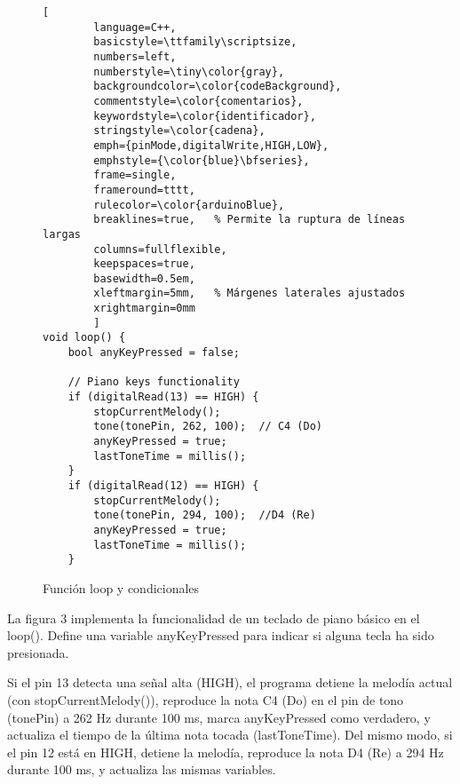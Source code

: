 
\setlength{\parindent}{0pt}
\setlength{\parskip}{6pt}



\begin{figure}[H]
	\centering
	\begin{lstlisting}[
		language=C++,
		basicstyle=\ttfamily\scriptsize,
		numbers=left,
		numberstyle=\tiny\color{gray},
		backgroundcolor=\color{codeBackground},
		commentstyle=\color{comentarios},
		keywordstyle=\color{identificador},
		stringstyle=\color{cadena},
		emph={pinMode,digitalWrite,HIGH,LOW},
		emphstyle={\color{blue}\bfseries},
		frame=single,
		frameround=tttt,
		rulecolor=\color{arduinoBlue},
		breaklines=true,   % Permite la ruptura de líneas largas
		columns=fullflexible,
		keepspaces=true,
		basewidth=0.5em,
		xleftmargin=5mm,   % Márgenes laterales ajustados
		xrightmargin=0mm
		]
void loop() {
	bool anyKeyPressed = false;
	
	// Piano keys functionality
	if (digitalRead(13) == HIGH) {
		stopCurrentMelody();
		tone(tonePin, 262, 100);  // C4 (Do)
		anyKeyPressed = true;
		lastToneTime = millis();
	}
	if (digitalRead(12) == HIGH) {
		stopCurrentMelody();
		tone(tonePin, 294, 100);  //D4 (Re)
		anyKeyPressed = true;
		lastToneTime = millis();
	}
	\end{lstlisting}
	\caption{Función loop y condicionales}
	\label{fig:codigo-led}
\end{figure}
La figura 3  implementa la funcionalidad de un teclado de piano básico en el loop(). Define una variable anyKeyPressed para indicar si alguna tecla ha sido presionada.

Si el pin 13 detecta una señal alta (HIGH), el programa detiene la melodía actual (con stopCurrentMelody()), reproduce la nota C4 (Do) en el pin de tono (tonePin) a 262 Hz durante 100 ms, marca anyKeyPressed como verdadero, y actualiza el tiempo de la última nota tocada (lastToneTime). Del mismo modo, si el pin 12 está en HIGH, detiene la melodía, reproduce la nota D4 (Re) a 294 Hz durante 100 ms, y actualiza las mismas variables.
